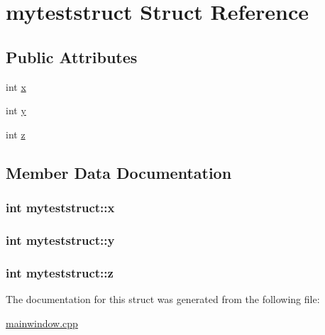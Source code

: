 \hypertarget{structmyteststruct}{\section{myteststruct Struct Reference}
\label{structmyteststruct}
}
\subsection*{Public Attributes}
\begin{DoxyCompactItemize}
\item 
int \hyperlink{structmyteststruct_a2a25e3e82c3ec8e4c9e2a6f6abe6a746}{x}
\item 
int \hyperlink{structmyteststruct_ade0ef34f12443469bad8641334c5931f}{y}
\item 
int \hyperlink{structmyteststruct_ad619e93b64c7295d8bb126ee2402372e}{z}
\end{DoxyCompactItemize}


\subsection{Member Data Documentation}
\hypertarget{structmyteststruct_a2a25e3e82c3ec8e4c9e2a6f6abe6a746}{
\subsubsection[{x}]{\setlength{\rightskip}{0pt plus 5cm}int myteststruct\-::x}}\label{structmyteststruct_a2a25e3e82c3ec8e4c9e2a6f6abe6a746}
\hypertarget{structmyteststruct_ade0ef34f12443469bad8641334c5931f}{
\subsubsection[{y}]{\setlength{\rightskip}{0pt plus 5cm}int myteststruct\-::y}}\label{structmyteststruct_ade0ef34f12443469bad8641334c5931f}
\hypertarget{structmyteststruct_ad619e93b64c7295d8bb126ee2402372e}{
\subsubsection[{z}]{\setlength{\rightskip}{0pt plus 5cm}int myteststruct\-::z}}\label{structmyteststruct_ad619e93b64c7295d8bb126ee2402372e}


The documentation for this struct was generated from the following file\-:\begin{DoxyCompactItemize}
\item 
\hyperlink{mainwindow_8cpp}{mainwindow.\-cpp}\end{DoxyCompactItemize}
